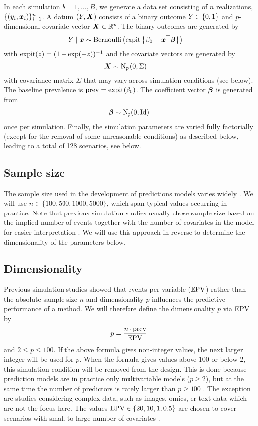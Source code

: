 In each simulation $b = 1, \dots, B$, we generate a data set consisting of $n$
realizations, \ie $\{(y_i, \text{\boldmath$x$}_i)\}_{i=1}^n$. A datum $(Y, \text{\boldmath$X$})$ consists of
a binary outcome $Y \in \{0, 1\}$ and $p$-dimensional covariate vector
$\text{\boldmath$X$} \in \mathbb{R}^p$. The binary outcomes are generated by
\begin{align*}
  Y \mid \text{\boldmath$x$} &\sim \operatorname{Bernoulli}\left(\operatorname{expit}\left\{\beta_0 +
	\text{\boldmath$x$}^\top\text{\boldmath$\beta$}\right\}\right)
\end{align*}
with $\operatorname{expit}(z) = (1 + \exp(-z))^{-1}$ and the covariate vectors are generated by
\begin{align*}
  \text{\boldmath$X$} &\sim \operatorname{N}_p\left(0, \Sigma\right)
\end{align*}
with covariance matrix $\Sigma$ that may vary across simulation conditions (see below).
The baseline prevalence is $\operatorname{prev} = \operatorname{expit}(\beta_0)$. The coefficient vector
$\text{\boldmath$\beta$}$ is generated from
\begin{align*}
  \text{\boldmath$\beta$} \sim \operatorname{N}_p(0, \operatorname{Id})
\end{align*}
once per simulation. Finally, the simulation parameters are varied
fully factorially (except for the removal of some unreasonable conditions) as described below, leading to a total of 128
scenarios, see below.

\subsection*{Sample size}
The sample size used in the development of predictions models varies widely
\citep{Damen2016}. We will use $n \in \{100, 500, 1000, 5000\}$, which span typical values
occurring in practice. Note that previous simulation studies usually chose sample
size based on the implied number of events together with the number of covariates
in the model for easier interpretation \citep{vanSmeden2018, Riley2018}. We will use this approach in
reverse to determine the dimensionality of the parameters below.

\subsection*{Dimensionality}
Previous simulation studies showed that events per variable ($\operatorname{EPV}$) rather than the absolute sample
size $n$ and dimensionality $p$ influences the predictive performance of a
method. We will therefore define the dimensionality $p$ via EPV
by $$p = \frac{n \cdot \operatorname{prev}}{\operatorname{EPV}}$$ and $2 \leq p \leq 100.$ If the
above formula gives non-integer values, the next larger integer will be used for
$p$. When the formula gives values above 100 or below 2, this simulation
condition will be removed from the design. This is done because prediction
models are in practice only multivariable models ($p \geq 2$), but at the same
time the number of predictors is rarely larger than $p \geq 100$
\citep{Kreuzberger2020,Seker2020, Wynants2020}. The exception are studies
considering complex data, such as images, omics, or text data which are not the
focus here. The values $\operatorname{EPV} \in \{20, 10, 1, 0.5\}$ are chosen to cover scenarios
with small to large number of covariates \citep[\cf][]{vanSmeden2018}.

